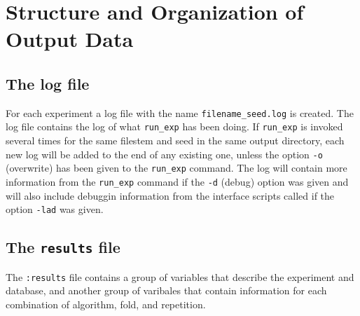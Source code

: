 \documentclass[a4paper,10pt,twoside]{article}
\begin{document}



\section{Structure and Organization of Output Data}
\label{output}
\subsection{The log file}

For each experiment a log file with the name \texttt{filename\_seed.log}
is created. The log file contains the log of what \texttt{run\_exp} 
has been doing. If \texttt{run\_exp} is invoked several times for
the same filestem and seed in the same output directory, each 
new log will be added to the end of any existing one, unless
the option \texttt{-o} (overwrite) has been given to the 
\texttt{run\_exp} command. The log will contain more information
from the \texttt{run\_exp} command if the \texttt{-d} (debug) option 
was given and will also include debuggin information from the 
interface scripts called if the option \texttt{-lad} was given.


\subsection{The \texttt{results} file}

The \verb=:results= file contains  a group of variables that
describe the experiment and database, and another group of varibales
that contain information for each combination of algorithm, fold, and
repetition. 
\end{document}
